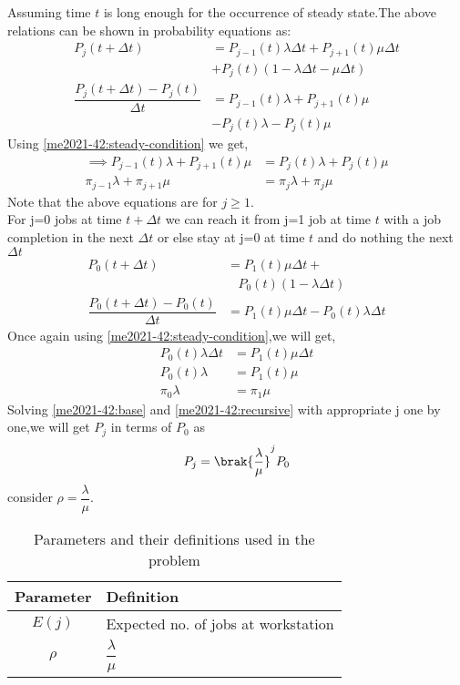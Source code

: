  Assuming time  $t$ is long enough for the occurrence of steady state.The above relations can be shown in probability equations as:  
 \begin{align}
     P_j(t+\Delta t)&=P_{j-1}(t)\lambda\Delta t+ P_{j+1}(t)\mu \Delta t \nonumber\\&+P_j (t) (1-\lambda\Delta t -\mu \Delta t)\\
     \dfrac{P_j(t+\Delta t)-P_j (t)}{\Delta t}&= P_{j-1}(t)\lambda +P_{j+1}(t)\mu\nonumber\\& - P_j(t)\lambda -P_j(t)\mu
\end{align}
Using \eqref{me2021-42:steady-condition} we get,
\begin{align}
     \implies P_{j-1}(t)\lambda +P_{j+1}(t)\mu&=P_j(t)\lambda +P_j(t)\mu \\
     \pi_{j-1}\lambda +\pi_{j+1}\mu&=\pi_j\lambda +\pi_j\mu\label{me2021-42:recursive} 
 \end{align}
 Note that the above equations are  for $j \geq 1$. \\
 For j=0 jobs at time $t+\Delta t$ we can reach it from j=1 job at time $t$ with a job completion in the next $\Delta t$ or else stay at j=0 at time $t$ and do nothing the next $\Delta t$
\begin{align}
    P_0(t+\Delta t)&=P_1(t)\mu \Delta t+\nonumber\\&~~~~P_0(t)(1-\lambda \Delta t)\\
    \dfrac{P_0(t+\Delta t)-P_0(t)}{\Delta t}&=P_1(t) \mu \Delta t-P_0(t)\lambda \Delta t
\end{align}
Once again using \eqref{me2021-42:steady-condition},we will get,
\begin{align}
    P_0(t)\lambda \Delta t&= P_1(t) \mu \Delta t\\
    P_0(t)\lambda&=P_1(t) \mu \\
    \pi_0 \lambda&=\pi_1\mu\label{me2021-42:base}
\end{align}
Solving \eqref{me2021-42:base} and \eqref{me2021-42:recursive} with appropriate j one by one,we will get $P_j$ in terms of $P_0$ as
\begin{equation}
    P_j=\brak{\dfrac{\lambda}{\mu}}^jP_0 
\end{equation}
consider $\rho = \dfrac{\lambda}{\mu}$.
\begin{table}[h]
\begin{tabular}{|c|p{6cm}|}
\hline
\textbf{Parameter} & \textbf{Definition}                               \\ \hline
$E(j)$             & Expected no. of jobs at workstation \\ \hline
$\rho$             & $\dfrac{\lambda}{\mu}$\\\hline
\end{tabular}
\caption{Parameters and their definitions used in the problem}
\label{me2021-42:tab:parameters2}
\end{table}
